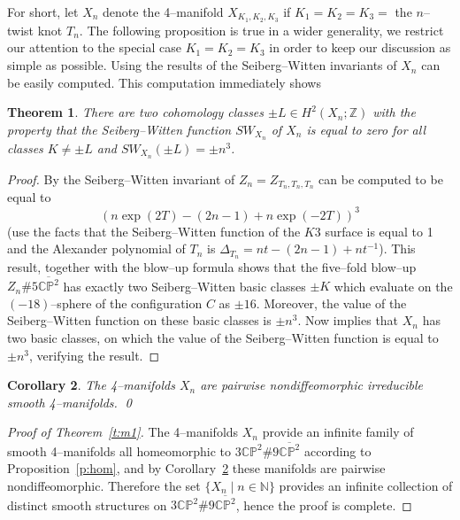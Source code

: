 \documentclass[11pt]{gtart}
\newtheorem{thm}{Theorem}[section]
\newtheorem{cor}[thm]{Corollary}
\theoremstyle{definition}
\numberwithin{equation}{section}
\newcommand{\bfn}{{\mathbb {N}}}
\newcommand{\bfz}{{\mathbb {Z}}}
\newcommand{\cpkk}{{\overline {{\mathbb C}{\mathbb P}^2}}}
\newcommand{\cpk}{{\mathbb {CP}}^2}
\begin{document}
For short, let $X_n$ denote the 4--manifold $X_{K_1,K_2,K_3}$ if
$K_1=K_2=K_3=$ the $n$--twist knot $T_n$. The following proposition is
true in a wider generality, we restrict our attention to the special
case $K_1=K_2=K_3$ in order to keep our discussion as simple as possible.
Using the results of \cite{FS1, FSknot} the Seiberg--Witten invariants
of $X_n$ can be easily computed. This computation immediately shows

\begin{thm}\label{t:sw}
There are two cohomology classes $\pm L\in H^2 (X_n ; \bfz )$ with the
property that the Seiberg--Witten function $SW_{X_n}$ of $X_n$ is
equal to zero for all classes $K\neq \pm L$ and $SW_{X_n}(\pm L)=\pm
n^3$.
\end{thm}
\begin{proof}
By \cite[Theorem~1.1]{FSknot} the Seiberg--Witten invariant of
$Z_n=Z_{T_n,T_n,T_n}$ can be computed to be equal to
\[
(n\exp (2T)-(2n-1)+n\exp (-2T))^3
\]
(use the facts that the Seiberg--Witten function of the $K3$ surface
is equal to 1 and the Alexander polynomial of $T_n$ is $\Delta
_{T_n}=nt-(2n-1)+nt^{-1}$). This result, together with the blow--up
formula shows that the five--fold blow--up $Z_n \# 5 \cpkk$ has
exactly two Seiberg--Witten basic classes $\pm K$ which evaluate on
the $(-18)$--sphere of the configuration $C$ as $\pm 16$. Moreover,
the value of the Seiberg--Witten function on these basic classes is
$\pm n^3$.  Now \cite[Theorem~8.5]{FS1} implies that $X_n$ has two
basic classes, on which the value of the Seiberg--Witten function is
equal to $\pm n^3$, verifying the result.
\end{proof}


\begin{cor}\label{c:nondiffeo}
The 4--manifolds $X_n$ are pairwise nondiffeomorphic irreducible smooth
4--manifolds. \qed
\end{cor}

\begin{proof}[Proof of Theorem~\ref{t:m1}]
The 4--manifolds $X_n$ provide an infinite family of smooth
4--manifolds all homeomorphic to $3\cpk \# 9 \cpkk$ according to
Proposition~\ref{p:hom}, and by Corollary~\ref{c:nondiffeo} these
manifolds are pairwise nondiffeomorphic. Therefore the set $\{ X_n
\mid n \in \bfn \}$ provides an infinite collection of distinct
smooth structures on $3\cpk \# 9 \cpkk$, hence the proof is complete.
\end{proof}
\end{document}
